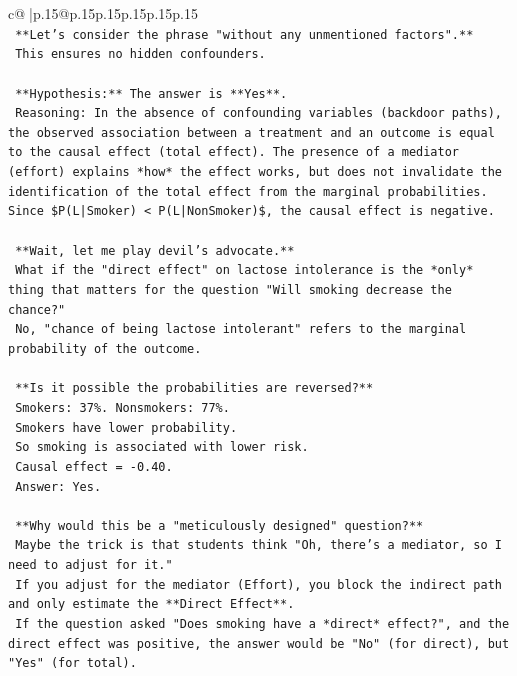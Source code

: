 \documentclass{article}
\begin{document}
{\begin{supertabular}{c@{$\;$}|p{.15\linewidth}@{}p{.15\linewidth}p{.15\linewidth}p{.15\linewidth}p{.15\linewidth}p{.15\linewidth}}
{{{\\ 
\texttt{    **Let's consider the phrase "without any unmentioned factors".**} \\
\texttt{    This ensures no hidden confounders.} \\
\\ 
\texttt{    **Hypothesis:** The answer is **Yes**.} \\
\texttt{    Reasoning: In the absence of confounding variables (backdoor paths), the observed association between a treatment and an outcome is equal to the causal effect (total effect). The presence of a mediator (effort) explains *how* the effect works, but does not invalidate the identification of the total effect from the marginal probabilities. Since \$P(L|Smoker) < P(L|NonSmoker)\$, the causal effect is negative.} \\
\\ 
\texttt{    **Wait, let me play devil's advocate.**} \\
\texttt{    What if the "direct effect" on lactose intolerance is the *only* thing that matters for the question "Will smoking decrease the chance?"} \\
\texttt{    No, "chance of being lactose intolerant" refers to the marginal probability of the outcome.} \\
\\ 
\texttt{    **Is it possible the probabilities are reversed?**} \\
\texttt{    Smokers: 37\%. Nonsmokers: 77\%.} \\
\texttt{    Smokers have lower probability.} \\
\texttt{    So smoking is associated with lower risk.} \\
\texttt{    Causal effect = {-}0.40.} \\
\texttt{    Answer: Yes.} \\
\\ 
\texttt{    **Why would this be a "meticulously designed" question?**} \\
\texttt{    Maybe the trick is that students think "Oh, there's a mediator, so I need to adjust for it."} \\
\texttt{    If you adjust for the mediator (Effort), you block the indirect path and only estimate the **Direct Effect**.} \\
\texttt{    If the question asked "Does smoking have a *direct* effect?", and the direct effect was positive, the answer would be "No" (for direct), but "Yes" (for total).} \\
}}}
\end{supertabular}}
\end{document}
